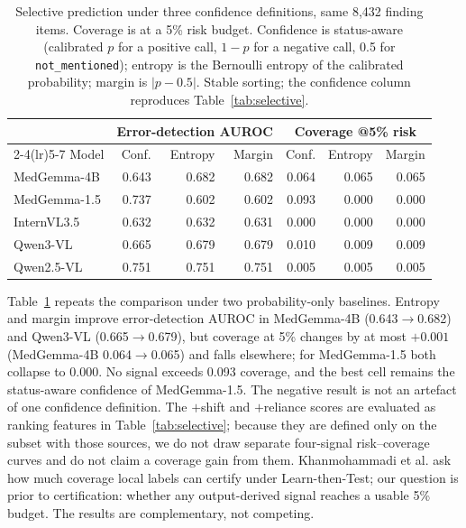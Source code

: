 \begin{table}[t]
\centering
\footnotesize
\caption{Selective prediction under three confidence definitions, same 8,432 finding
items. Coverage is at a 5\% risk budget. Confidence is status-aware (calibrated $p$ for a
positive call, $1-p$ for a negative call, 0.5 for \texttt{not\_mentioned}); entropy is the
Bernoulli entropy of the calibrated probability; margin is $|p-0.5|$. Stable sorting; the
confidence column reproduces Table~\ref{tab:selective}.}
\label{tab:selective-baselines}
\begin{tabular}{lrrrrrr}
\toprule
& \multicolumn{3}{c}{Error-detection AUROC} & \multicolumn{3}{c}{Coverage @5\% risk} \\
\cmidrule(lr){2-4}\cmidrule(lr){5-7}
Model & Conf. & Entropy & Margin & Conf. & Entropy & Margin \\
\midrule
MedGemma-4B & 0.643 & 0.682 & 0.682 & 0.064 & 0.065 & 0.065 \\
MedGemma-1.5 & 0.737 & 0.602 & 0.602 & 0.093 & 0.000 & 0.000 \\
InternVL3.5 & 0.632 & 0.632 & 0.631 & 0.000 & 0.000 & 0.000 \\
Qwen3-VL & 0.665 & 0.679 & 0.679 & 0.010 & 0.009 & 0.009 \\
Qwen2.5-VL & 0.751 & 0.751 & 0.751 & 0.005 & 0.005 & 0.005 \\
\bottomrule
\end{tabular}
\end{table}

Table~\ref{tab:selective-baselines} repeats the comparison under two probability-only
baselines. Entropy and margin improve error-detection AUROC in MedGemma-4B
(0.643$\rightarrow$0.682) and Qwen3-VL (0.665$\rightarrow$0.679), but coverage at 5\%
changes by at most $+0.001$ (MedGemma-4B 0.064$\rightarrow$0.065) and falls elsewhere; for
MedGemma-1.5 both collapse to 0.000. No signal exceeds 0.093 coverage, and the best cell
remains the status-aware confidence of MedGemma-1.5. The negative result is not an
artefact of one confidence definition. The $+$shift and $+$reliance scores are evaluated
as ranking features in Table~\ref{tab:selective}; because they are defined only on the
subset with those sources, we do not draw separate four-signal risk--coverage curves and
do not claim a coverage gain from them. Khanmohammadi et al. ask how much coverage local
labels can certify under Learn-then-Test; our question is prior to certification: whether
any output-derived signal reaches a usable 5\% budget. The results are complementary, not
competing.

